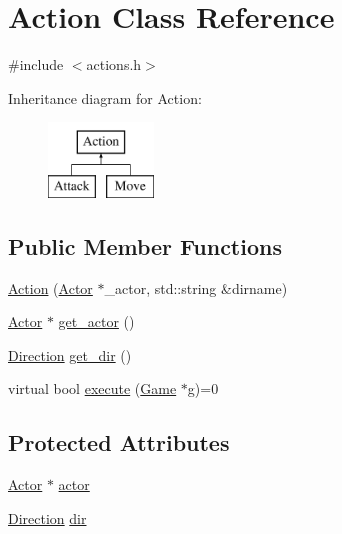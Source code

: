 \hypertarget{class_action}{\section{Action Class Reference}
\label{class_action}
}


{\ttfamily \#include $<$actions.\-h$>$}

Inheritance diagram for Action\-:\begin{figure}[H]
\begin{center}
\leavevmode
\includegraphics[height=2.000000cm]{class_action}
\end{center}
\end{figure}
\subsection*{Public Member Functions}
\begin{DoxyCompactItemize}
\item 
\hyperlink{class_action_a97da8add4b456b38347ad3447e136d48}{Action} (\hyperlink{class_actor}{Actor} $\ast$\-\_\-actor, std\-::string \&dirname)
\item 
\hyperlink{class_actor}{Actor} $\ast$ \hyperlink{class_action_a7dd87350cb42eccbf2d096eb4f1f9a85}{get\-\_\-actor} ()
\item 
\hyperlink{class_direction}{Direction} \hyperlink{class_action_a26fff2d0b1eaf0109170fe6d8fe77879}{get\-\_\-dir} ()
\item 
virtual bool \hyperlink{class_action_a18a2520db7750f26d7a571c990b82daf}{execute} (\hyperlink{class_game}{Game} $\ast$g)=0
\end{DoxyCompactItemize}
\subsection*{Protected Attributes}
\begin{DoxyCompactItemize}
\item 
\hyperlink{class_actor}{Actor} $\ast$ \hyperlink{class_action_aead5ee9e455a9b0033aca036776c255b}{actor}
\item 
\hyperlink{class_direction}{Direction} \hyperlink{class_action_a04c069c93bbaf099b040379ed976c936}{dir}
\end{DoxyCompactItemize}


